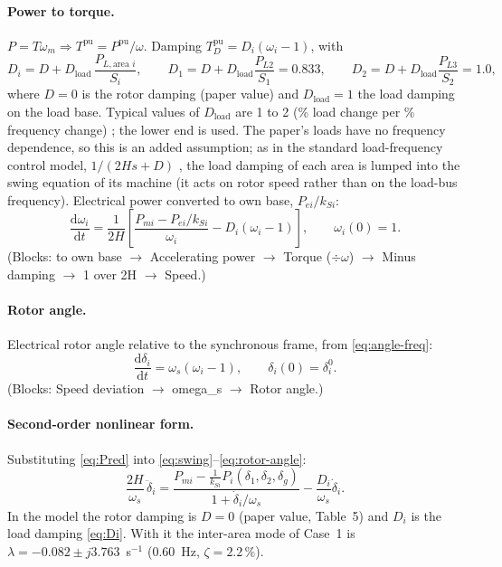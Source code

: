\documentclass[11pt,a4paper]{article}
\numberwithin{equation}{section}
\newcommand{\dd}{\mathrm{d}}
\newcommand{\blk}[1]{\textsf{#1}}
\begin{document}
\paragraph{Power to torque.} $P = T\omega_m \Rightarrow T^{\text{pu}} = P^{\text{pu}}/\omega$. Damping $T_D^{\text{pu}} = D_i(\omega_i-1)$, with
\begin{equation}
D_i = D + D_{\text{load}}\,\frac{P_{L,\text{area }i}}{S_i},\qquad
D_1 = D + D_{\text{load}}\frac{P_{L2}}{S_1} = 0.833,\qquad
D_2 = D + D_{\text{load}}\frac{P_{L3}}{S_2} = 1.0 ,
\label{eq:Di}
\end{equation}
where $D = 0$ is the rotor damping (paper value) and $D_{\text{load}} = 1$ the load damping on the load base. Typical values of $D_{\text{load}}$ are 1 to 2 (\% load change per \% frequency change) \cite[Sec.~11.1.3]{Kundur1994}; the lower end is used. The paper's loads have no frequency dependence, so this is an added assumption; as in the standard load-frequency control model, $1/(2Hs + D)$ \cite[Ch.~11]{Kundur1994}, the load damping of each area is lumped into the swing equation of its machine (it acts on rotor speed rather than on the load-bus frequency).
Electrical power converted to own base, $P_{ei}/k_{Si}$:
\begin{equation}
\boxed{\frac{\dd\omega_i}{\dd t} = \frac{1}{2H}\left[\frac{P_{mi} - P_{ei}/k_{Si}}{\omega_i} - D_i(\omega_i - 1)\right],\qquad \omega_i(0)=1.}
\label{eq:swing}
\end{equation}
(Blocks: \blk{to own base} $\to$ \blk{Accelerating power} $\to$ \blk{Torque} ($\div\omega$) $\to$ \blk{Minus damping} $\to$ \blk{1 over 2H} $\to$ \blk{Speed}.)

\paragraph{Rotor angle.} Electrical rotor angle relative to the synchronous frame, from \eqref{eq:angle-freq}:
\begin{equation}
\boxed{\frac{\dd\delta_i}{\dd t} = \omega_s(\omega_i - 1),\qquad \delta_i(0) = \delta_i^0.}
\label{eq:rotor-angle}
\end{equation}
(Blocks: \blk{Speed deviation} $\to$ \blk{omega\_s} $\to$ \blk{Rotor angle}.)

\paragraph{Second-order nonlinear form.} Substituting \eqref{eq:Pred} into \eqref{eq:swing}--\eqref{eq:rotor-angle}:
\begin{equation}
\frac{2H}{\omega_s}\,\ddot\delta_i
= \frac{P_{mi} - \tfrac{1}{k_{Si}}P_i(\delta_1,\delta_2,\delta_g)}{1+\dot\delta_i/\omega_s}
- \frac{D_i}{\omega_s}\dot\delta_i .
\end{equation}
In the model the rotor damping is $D=0$ (paper value, Table~5) and $D_i$ is the load damping \eqref{eq:Di}. With it the inter-area mode of Case~1 is $\lambda = -0.082 \pm j3.763$~s$^{-1}$ (0.60~Hz, $\zeta = 2.2\,\%$).
\end{document}
